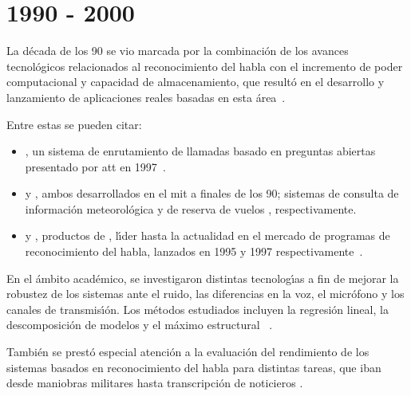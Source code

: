 \section{1990 - 2000}
\label{sec:90s}

La d\'ecada de los 90 se vio marcada por la combinaci\'on de los avances tecnol\'ogicos relacionados al reconocimiento del habla con el incremento de poder computacional y capacidad de almacenamiento, que result\'o en el desarrollo y
lanzamiento de aplicaciones reales basadas en esta \mbox{\'area \cite{JuangAutomaticSpeech, GauvainLarge2000}}.

Entre estas se pueden citar:
\begin{itemize}
\item {}, un sistema de enrutamiento de llamadas basado en preguntas abiertas presentado por 
\gls{att} en \mbox{1997 \cite{Sachs97howmay}}. 

\item {} y , ambos desarrollados en el \gls{mit} a finales de los 90; sistemas de consulta de informaci\'on meteorol\'ogica \cite{ZueJupiter2000} y  de reserva de vuelos \cite{Seneff2000Dialogue}, respectivamente.

\item {} y , productos de , l{\'\i}der hasta la actualidad en el mercado de programas de reconocimiento del habla, lanzados en 1995 y 1997 
\mbox{respectivamente \cite{BarnettMultilingual1996, BlandingSpeechless2012}}.
\end{itemize}

En el \'ambito acad\'emico, se investigaron distintas tecnolog{\'\i}as a fin de mejorar la robustez de los sistemas ante el ruido, las diferencias en la voz, el micr\'ofono y los canales de transmis{\'\i}\'on. Los m\'etodos estudiados incluyen la regresi\'on lineal,
la descomposici\'on de modelos y el m\'aximo estructural \mbox{ \cite{AnusuyaSpeech2009}}.

Tambi\'en se prest\'o especial atenci\'on a la evaluaci\'on del rendimiento de los sistemas basados en reconocimiento del habla para distintas tareas, que iban desde maniobras militares hasta transcripci\'on de noticieros \cite{JuangAutomaticSpeech}.